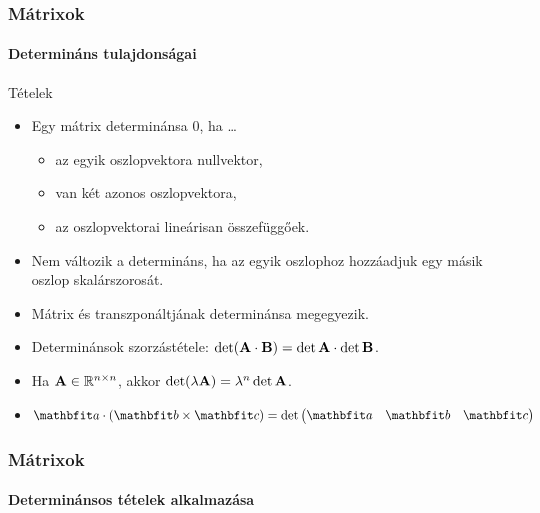 \begin{frame}
  \frametitle{Mátrixok}
  \framesubtitle{Determináns tulajdonságai}

  \begin{block}{Tételek}
    \begin{itemize}
      \item Egy mátrix determinánsa 0, ha \dots
            \begin{itemize}
              \item az egyik oszlopvektora nullvektor,
              \item van két azonos oszlopvektora,
              \item az oszlopvektorai lineárisan összefüggőek.
            \end{itemize}
      \item Nem változik a determináns, ha az egyik oszlophoz hozzáadjuk egy
            másik oszlop skalárszorosát.
      \item Mátrix és transzponáltjának determinánsa megegyezik.
      \item Determinánsok szorzástétele:
            $\det (\mathbf{A} \cdot \mathbf{B}) = \det \mathbf{A} \cdot \det \mathbf{B}$.
      \item Ha $\mathbf{A} \in \mathbb R^{n \times n}$, akkor
            $\det (\lambda \mathbf{A}) = \lambda^n \det \mathbf{A}$.
      \item \(
            \rvec a \cdot (\rvec b \times \rvec c) = \det \begin{pmatrix}
              \rvec a & \rvec b & \rvec c
            \end{pmatrix}
            \)
    \end{itemize}
  \end{block}
\end{frame}

\begin{frame}
  \frametitle{Mátrixok}
  \framesubtitle{Determinánsos tételek alkalmazása}

  
\end{frame}

